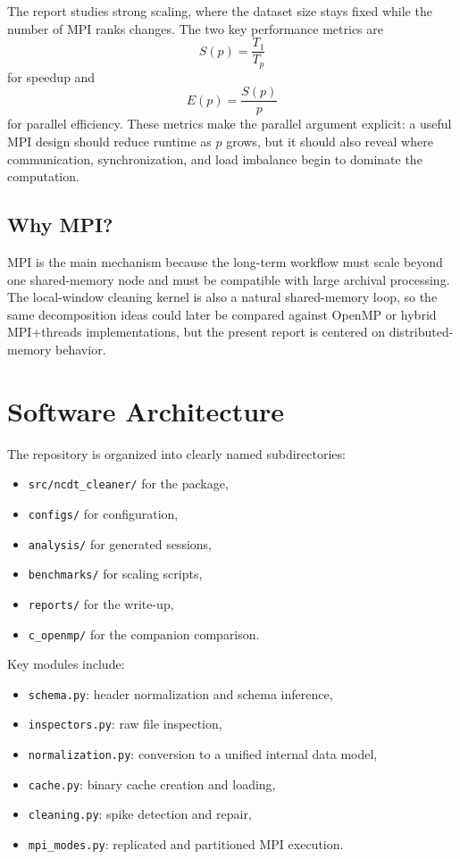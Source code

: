 \documentclass[11pt]{article}
\begin{document}
The report studies strong scaling, where the dataset size stays fixed while the number of MPI ranks changes. The two key performance metrics are
\[
S(p) = \frac{T_1}{T_p}
\]
for speedup \cite{amdahl1967} and
\[
E(p) = \frac{S(p)}{p}
\]
for parallel efficiency. These metrics make the parallel argument explicit: a useful MPI design should reduce runtime as $p$ grows, but it should also reveal where communication, synchronization, and load imbalance begin to dominate the computation.

\subsection{Why MPI?}
MPI is the main mechanism because the long-term workflow must scale beyond one shared-memory node and must be compatible with large archival processing. The local-window cleaning kernel is also a natural shared-memory loop, so the same decomposition ideas could later be compared against OpenMP or hybrid MPI+threads implementations, but the present report is centered on distributed-memory behavior.

\section{Software Architecture}
The repository is organized into clearly named subdirectories:
\begin{itemize}
  \item \texttt{src/ncdt\_cleaner/} for the package,
  \item \texttt{configs/} for configuration,
  \item \texttt{analysis/} for generated sessions,
  \item \texttt{benchmarks/} for scaling scripts,
  \item \texttt{reports/} for the write-up,
  \item \texttt{c\_openmp/} for the companion comparison.
\end{itemize}

Key modules include:
\begin{itemize}
  \item \texttt{schema.py}: header normalization and schema inference,
  \item \texttt{inspectors.py}: raw file inspection,
  \item \texttt{normalization.py}: conversion to a unified internal data model,
  \item \texttt{cache.py}: binary cache creation and loading,
  \item \texttt{cleaning.py}: spike detection and repair,
  \item \texttt{mpi\_modes.py}: replicated and partitioned MPI execution.
\end{itemize}
\end{document}

